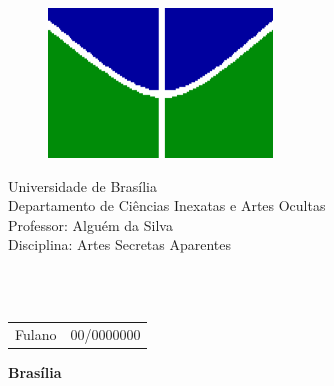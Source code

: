 \begin{figure}[h!]
\centering
\includegraphics[scale=0.9]{img/simb_unb.png}
\label{fig:unb}
\end{figure}

\begin{center}
{\LARGE Universidade de Brasília}\\
Departamento de Ciências Inexatas e Artes Ocultas\\
Professor: Alguém da Silva\\
Disciplina: Artes Secretas Aparentes\\
\end{center}


\vspace{0.18\textheight}

\begin{center}
    \Huge \textbf{\\\thetitle \\}
\end{center}

\vspace*{\fill} %


\begin{table}[H]
    \begin{tabular}{ll}
        Fulano & 00/0000000 \\
    \end{tabular}
\end{table}

\vspace{0.5cm}

\begin{center}
    \textbf{Brasília\\
    \the\year} %
\end{center}

\thispagestyle{empty} %

\newpage
\tableofcontents
\newpage

